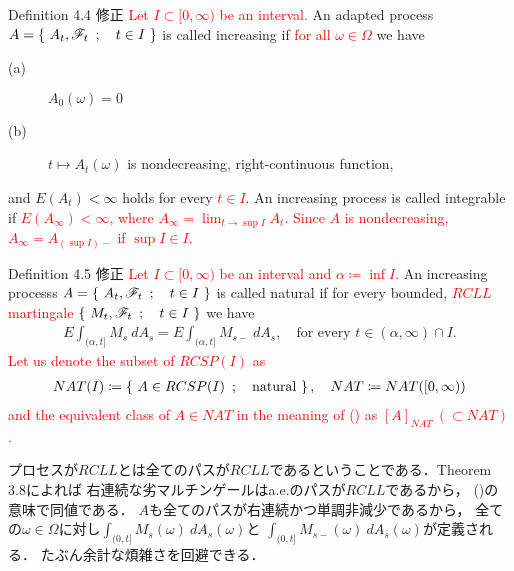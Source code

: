 	\begin{itembox}[l]{Definition 4.4 修正}
		\textcolor{red}{Let $I \subset [0,\infty)$ be an interval.}
		An adapted process \textcolor{red}{$A = \left\{\ A_t,\mathscr{F}_t\ \, ; \quad t \in I\ \right\}$} 
		is called increasing if \textcolor{red}{for all $\omega \in \Omega$} we have
		\begin{description}
			\item[(a)] $A_0(\omega) = 0$
			\item[(b)] $t \longmapsto A_t(\omega)$ is nondecreasing, right-continuous function,
		\end{description}
		and $E(A_t) < \infty$ holds for every \textcolor{red}{$t \in I$}.
		An increasing process is called integrable if \textcolor{red}{$E\left(A_{\infty}\right) < \infty$,
		where $A_{\infty} = \lim_{t \to \sup{}{I}} A_t$.
		Since $A$ is nondecreasing, $A_{\infty} = A_{(\sup{}{I})-}$ if $\sup{}{I} \in I$.}
	\end{itembox}
	
	\begin{itembox}[l]{Definition 4.5 修正}
		\textcolor{red}{Let $I \subset [0,\infty)$ be an interval and $\alpha \coloneqq \inf{}{I}$.}
		An increasing processs \textcolor{red}{$A = \left\{\ A_t,\mathscr{F}_t\ \, ; \quad t \in I\ \right\}$} 
		is called natural if for every bounded, 
		\textcolor{red}{$RCLL$ martingale $\left\{\ M_t,\mathscr{F}_t\ \, ; \quad t \in I\ \right\}$} we have
		\begin{align}
			E \int_{(\alpha,t]} M_s\ dA_s = E \int_{(\alpha,t]} M_{s-}\ dA_s,
			\quad \mbox{for every $t \in (\alpha,\infty) \cap I$}.
		\end{align}
		\textcolor{red}{Let us denote the subset of $RCSP(I)$ as
		\begin{align}
			NAT(I) \coloneqq
			\left\{\ A \in RCSP(I)\ \, ; \quad \mbox{natural}\ \right\},
			\quad NAT \coloneqq NAT([0,\infty))
		\end{align}
		and the equivalent class of $A \in NAT$
		in the meaning of () as $[A]_{NAT}\ ( \subset NAT)$.}
	\end{itembox}
	
	プロセスが$RCLL$とは全てのパスが$RCLL$であるということである．Theorem 3.8によれば
	右連続な劣マルチンゲールはa.e.のパスが$RCLL$であるから，
	()の意味で同値である．
	$A$も全てのパスが右連続かつ単調非減少であるから，
	全ての$\omega \in \Omega$に対し$\int_{(0,t]} M_s(\omega)\ dA_s(\omega)$と
	$\int_{(0,t]} M_{s-}(\omega)\ dA_s(\omega)$が定義される．
	たぶん余計な煩雑さを回避できる．
		
